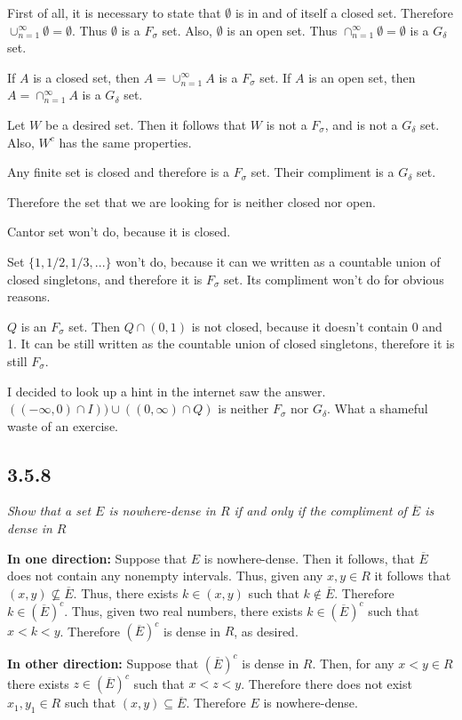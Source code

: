 \documentclass[11pt,oneside,titlepage]{book}
\begin{document}
First of all, it is necessary to state that $\emptyset$ is in and of itself a
closed set. Therefore $\cup_{n = 1}^{\infty} \emptyset = \emptyset$. Thus
$\emptyset$ is a $F_\sigma$ set. Also, $\emptyset$ is an open set. Thus
$\cap_{n = 1}^{\infty} \emptyset = \emptyset$ is a $G_\delta$ set.

If $A$ is a closed set, then $A = \cup_{n = 1}^{\infty} A$ is a $F_\sigma$ set.
If $A$ is an open set, then $A = \cap_{n = 1}^{\infty} A$ is a $G_\delta$ set.

Let $W$ be a desired set. Then it follows that $W$ is not a $F_\sigma$, and
is not  a $G_\delta$ set. Also, $W^c$ has the same properties.

Any finite set is closed and therefore is a $F_\sigma$ set. Their compliment
is a $G_\delta$ set.

Therefore the set that we are looking for is neither closed nor open.

Cantor set won't do, because it is closed.

Set $\{1, 1/2, 1/3, ...\}$ won't do, because it can we written as a
countable union of closed singletons, and therefore it is $F_\sigma$ set.
Its compliment won't do for obvious reasons.

$Q$ is an $F_\sigma$ set. Then $Q \cap (0, 1)$ is not closed, because
it doesn't contain 0 and 1. It can be still written as the countable union of closed
singletons, therefore it is still $F_\sigma$.

I decided to look up a hint in the internet saw the answer.
$((-\infty, 0) \cap I)) \cup ((0, \infty) \cap Q)$ is neither $F_\sigma$ nor
$G_\delta$. What a shameful waste of an exercise.


\subsection*{3.5.8}
\textit{Show that a set $E$ is nowhere-dense in $R$ if and only if the
  compliment of $\overline E$ is dense in $R$}

\textbf{In one direction:}
Suppose that $E$ is nowhere-dense. Then it follows, that $\overline E$ does
not contain any nonempty intervals. Thus, given any $x, y \in R$ it follows
that $(x, y) \not \subseteq \overline E$. Thus, there exists $k \in (x, y)$
such that $k \not \in \overline E$. Therefore $k \in (\overline E)^c$.
Thus, given two real numbers, there exists $k \in (\overline E)^c$ such
that $x < k < y$. Therefore $(\overline E)^c$ is dense in $R$, as desired.

\textbf{In other direction:}
Suppose that $(\overline E)^c$ is dense in $R$. Then, for any $x < y \in R$
there exists $z \in (\overline E)^c$ such that $x < z < y$. Therefore
there does not exist $x_1, y_1 \in R$ such that $(x, y) \subseteq \overline E$.
Therefore $E$ is nowhere-dense.
\end{document}
